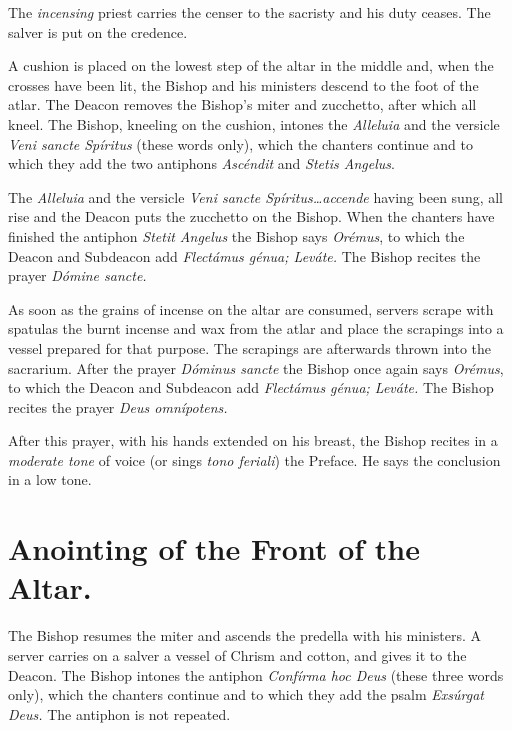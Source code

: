 \documentclass[letterpaper]{report}
\begin{document}
{The \textit{incensing} priest carries the censer to the sacristy and his duty
ceases. The salver is put on the credence.

\rubric A cushion is placed on the lowest step of the altar in the middle and,
when the crosses have been lit, the Bishop and his ministers descend to the
foot of the atlar. The Deacon removes the Bishop's miter and zucchetto, after
which all kneel. The Bishop, kneeling on the cushion, intones the
\textit{Alleluia} and the versicle \textit{Veni sancte Spíritus} (these words
only), which the chanters continue and to which they add the two antiphons
\textit{Ascéndit} and \textit{Stetis Angelus}.

\rubric The \textit{Alleluia} and the versicle \textit{Veni sancte
Spíritus\dots accende} having been sung, all rise and the Deacon puts the
zucchetto on the Bishop. When the chanters have finished the antiphon
\textit{Stetit Angelus} the Bishop says \textit{Orémus}, to which the Deacon
and Subdeacon add \textit{Flectámus génua; Leváte.} The Bishop recites the
prayer \textit{Dómine sancte.}

\rubric As soon as the grains of incense on the altar are consumed, servers
scrape with spatulas the burnt incense and wax from the atlar and place the
scrapings into a vessel prepared for that purpose. The scrapings are afterwards
thrown into the sacrarium. After the prayer \textit{Dóminus sancte} the Bishop
once again says \textit{Orémus}, to which the Deacon and Subdeacon add
\textit{Flectámus génua; Leváte.} The Bishop recites the prayer \textit{Deus
omnípotens.}

\rubric After this prayer, with his hands extended on his breast, the Bishop
recites in a \textit{moderate tone} of voice (or sings \textit{tono feriali})
the Preface. He says the conclusion in a low tone.

\section{Anointing of the Front of the Altar.}

\rubric The Bishop resumes the miter and ascends the predella with his
ministers. A server carries on a salver a vessel of Chrism and cotton, and
gives it to the Deacon. The Bishop intones the antiphon \textit{Confírma hoc
Deus} (these three words only), which the chanters continue and to which they
add the psalm \textit{Exsúrgat Deus.} The antiphon is not repeated.

}
\end{document}
